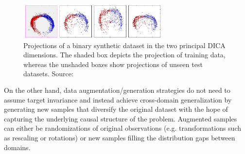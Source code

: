 \begin{figure}[H]
    \centering
    \includegraphics[width=0.67\textwidth]{img/introduction/dica.png}
    \caption{
    Projections of a binary synthetic dataset in the two principal DICA
    dimensions. The shaded box depicts the projection of training 
    data, whereas the unshaded boxes show projections of unseen 
    test datasets. Source: \cite{muandetDomainGeneralizationInvariant2013}
    }
    \label{fig:dica}
\end{figure}

On the other hand, data augmentation/generation strategies 
do not need to assume target invariance and instead 
achieve cross-domain generalization by generating new samples that
diversify the original dataset with the hope of capturing 
the underlying causal structure of the problem. Augmented samples
can either be randomizations of original observations (e.g. transformations
such as rescaling or rotations) or new samples filling the distribution
gaps between domains. \\

